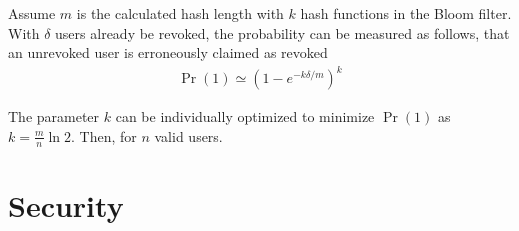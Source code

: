 \documentclass{IEEEconf}
\begin{document}
Assume $m$ is the calculated hash length with $k$ hash functions in the Bloom filter. With $\delta$ users already be revoked, the probability can be measured as follows, that an unrevoked user is erroneously claimed as revoked  
\begin{align} 
    \Pr(1) \simeq (1 - e^{-k\delta/m})^k 
 \end{align}

The parameter $k$ can be individually optimized to minimize $\Pr(1)$ as $ k = \frac{m}{n}\ln 2$. Then, for $n$ valid users.

\section{Security }
\end{document}

